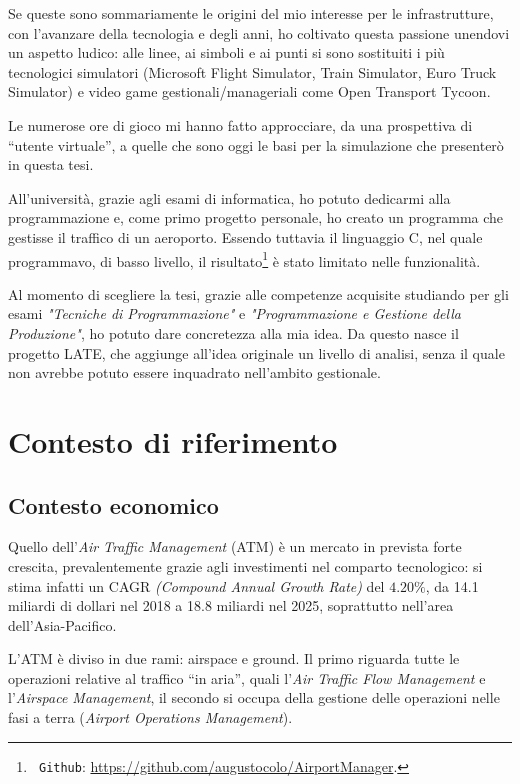 \documentclass[a4paper, 12pt]{article}
\begin{document}
Se queste sono sommariamente le origini del mio interesse per le infrastrutture, con l’avanzare della tecnologia e degli anni, ho coltivato questa passione unendovi un aspetto ludico: alle linee, ai simboli e ai punti si sono sostituiti i più tecnologici simulatori (Microsoft Flight Simulator, Train Simulator, Euro Truck Simulator) e video game gestionali/manageriali come Open Transport Tycoon. 

Le numerose ore di gioco mi hanno fatto approcciare, da una prospettiva di “utente virtuale”, a quelle che sono oggi le basi per la simulazione che presenterò in questa tesi.

All'università, grazie agli esami di informatica, ho potuto dedicarmi alla programmazione e, come primo progetto personale, ho creato un programma che gestisse il traffico di un aeroporto. Essendo tuttavia il linguaggio C, nel quale programmavo, di basso livello, il risultato\footnote{\texttt{ Github}: \url{https://github.com/augustocolo/AirportManager}.} è stato limitato nelle funzionalità.

Al momento di scegliere la tesi, grazie alle competenze acquisite studiando per gli esami \textit{"Tecniche di Programmazione"} e \textit{"Programmazione e Gestione della Produzione"}, ho potuto dare concretezza alla mia idea. Da questo nasce il progetto LATE, che aggiunge all’idea originale un livello di analisi, senza il quale non avrebbe potuto essere inquadrato nell’ambito gestionale.

\newpage

\section{Contesto di riferimento}
	\subsection{Contesto economico}

Quello dell’\textit{Air Traffic Management} (ATM) è un mercato in prevista forte crescita, prevalentemente grazie agli investimenti nel comparto tecnologico: si stima infatti un CAGR \textit{(Compound Annual Growth Rate)} del $4.20\%$, da 14.1 miliardi di dollari nel 2018 a 18.8 miliardi nel 2025, soprattutto nell’area dell’Asia-Pacifico\cite{markets_2018}.

L’ATM è diviso in due rami: airspace e ground. Il primo riguarda tutte le operazioni relative al traffico “in aria”, quali l’\textit{Air Traffic Flow Management} e l’\textit{Airspace Management}, il secondo si occupa della gestione delle operazioni nelle fasi a terra (\textit{Airport Operations Management}).
\end{document}
